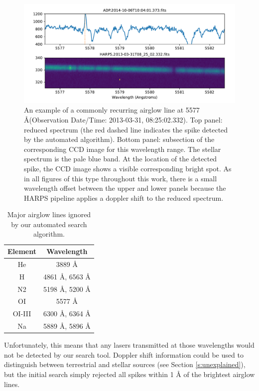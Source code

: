 \documentclass[twocolumn]{aastex701}
\begin{document}
\begin{figure}
    \centering
    \includegraphics[width=\textwidth]{clean-figures/airglowexample.pdf}
    \caption{An example of a commonly recurring airglow line at 5577 \AA (Observation Date/Time: 2013-03-31, 08:25:02.332). Top panel: reduced spectrum (the red dashed line indicates the spike detected by the automated algorithm).  Bottom panel: subsection of the corresponding CCD image for this wavelength range. The stellar spectrum is the pale blue band. At the location of the detected spike, the CCD image shows a visible corresponding bright spot.  As in all figures of this type throughout this work, there is a small wavelength offset between the upper and lower panels because the HARPS pipeline applies a doppler shift to the reduced spectrum.}
    \label{fig:airglowexample}
\end{figure}

\begin{table}
\begin{center}
\begin{tabular}{|c|c|} 
 \hline
 Element & Wavelength \\ 
 \hline
 He & 3889 \AA \\ 
 \hline
 H & 4861 \AA, 6563 \AA \\ 
 \hline
 N2 & 5198 \AA, 5200 \AA \\ 
 \hline
 OI & 5577 \AA \\
 \hline
 OI-III & 6300 \AA, 6364 \AA \\
 \hline
 Na & 5889 \AA , 5896 \AA \\
 \hline
 \end{tabular}
\end{center}
 \caption{Major airglow lines ignored by our automated search algorithm.}
 \label{table:AirglowWavelengths}
\end{table}

Unfortunately, this means that any lasers transmitted at those wavelengths would not be detected by our search tool.  Doppler shift information could be used to distinguish between terrestrial and stellar sources (see Section \ref{s:unexplained}), but the initial search simply rejected all spikes within 1 {\AA} of the brightest airglow lines.
\end{document}
